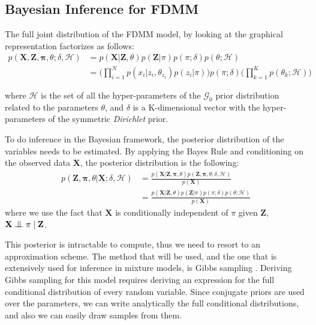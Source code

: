 \subsection{Bayesian Inference for FDMM} \label{fdmm-gibbs-subsect}
The full joint distribution of the FDMM model, by looking at the graphical representation factorizes as follows:
\begin{equation}
  \begin{aligned}
	p(\mathbf{X},\mathbf{Z},\mathbf{\pi},\theta;\delta,\mathcal{H}) & = p(\mathbf{X}|\mathbf{Z},\theta) p(\mathbf{Z}|\pi) p(\pi ;\delta) p(\theta ; \mathcal{H}) \\
	   & = \bigg(\prod\limits_{i=1}^{N} p(x_{i}|z_{i},\theta_{z_{i}}) p(z_{i}|\pi)\bigg) p(\pi;\delta) \bigg(\prod\limits_{k=1}^{K} p(\theta_{k}; \mathcal{H})\bigg)
  \end{aligned}
\end{equation}

where $\mathcal{H}$ is the set of all the hyper-parameters of the $\mathcal{G}_{0}$ prior distribution related to the parameters $\theta$, and $\delta$ is a K-dimensional vector with the hyper-parameters of the symmetric \emph{Dirichlet} prior. 

To do inference in the Bayesian framework, the posterior distribution of the variables needs to be estimated. By applying the Bayes Rule and conditioning on the observed data $\mathbf{X}$, the posterior distribution is the following:
\begin{equation}%
  \begin{aligned}
	p(\mathbf{Z},\mathbf{\pi},\theta|\mathbf{X} ;\delta,\mathcal{H}) & = \frac{p(\mathbf{X}|\mathbf{Z},\mathbf{\pi},\theta) p(\mathbf{Z},\mathbf{\pi},\theta ;\delta,\mathcal{H})}{p(\mathbf{X})} \\
	   & = \frac{p(\mathbf{X}|\mathbf{Z},\theta) p(\mathbf{Z}|\pi) p(\pi;\delta) p(\theta; \mathcal{H})} {p(\mathbf{X})}
  \end{aligned}
\end{equation}
where we use the fact that $\mathbf{X}$ is conditionally independent of $\pi$ given $\mathbf{Z}$, \ie $\mathbf{X} \bigCI \pi \;| \; \mathbf{Z}$. 

This posterior is intractable to compute, thus we need to resort to an approximation scheme. The method that will be used, and the one that is extensively used for inference in mixture models, is Gibbs sampling \cite{Geman1984}. Deriving Gibbs sampling for this model requires deriving an expression for the full conditional distribution of every random variable. Since conjugate priors are used over the parameters, we can write analytically the full conditional distributions, and also we can easily draw samples from them.

